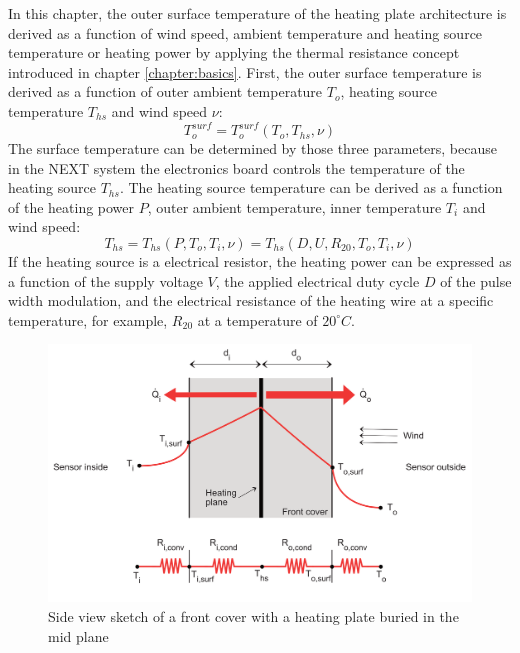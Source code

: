 In this chapter, the outer surface temperature of the heating plate architecture is derived as a function of wind speed, ambient temperature and heating source temperature or heating power by applying the thermal resistance concept introduced in chapter \ref{chapter:basics}. First, the outer surface temperature is derived as a function of outer ambient temperature \(T_o\), heating source temperature \(T_{hs}\) and wind speed \(\nu\):
\begin{equation}
T_o^{surf} = T_o^{surf}(T_o,T_{hs},\nu)
\end{equation}
The surface temperature can be determined by those three parameters, because in the NEXT system the electronics board controls the temperature of the heating source \(T_{hs}\). The heating source temperature can be derived as a function of the heating power \(P\), outer ambient temperature, inner temperature \(T_i\) and wind speed: 
\begin{equation}
T_{hs} = T_{hs}(P,T_o,T_i,\nu) = T_{hs}(D,U,R_{20}, T_o,T_i,\nu)
\end{equation}
If the heating source is a electrical resistor, the heating power can be expressed as a function of the supply voltage \(V\), the applied electrical duty cycle \(D\) of the pulse width modulation, and the electrical resistance of the heating wire at a specific temperature, for example, \(R_{20}\) at a temperature of \(20^{\circ}C\).  
\begin{figure} [H]
	\centering
	\includegraphics[scale=0.75]{Pictures/Model.png}
	\caption[Front Cover Heat Transfer Model]{Side view sketch of a front cover with a heating plate buried in the mid plane}
	\label{fig:platemodel}
\end{figure}

